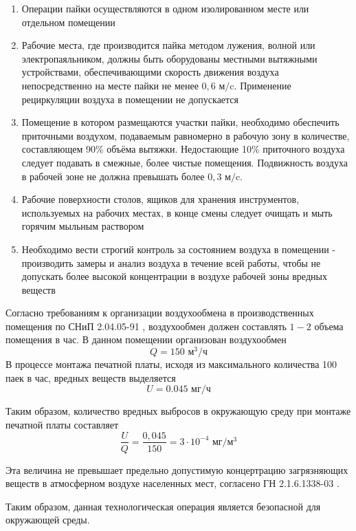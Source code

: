 \begin{enumerate}
    \item Операции пайки осуществляются в одном изолированном месте или отдельном помещении
    \item Рабочие места, где производится пайка методом лужения, волной или
        электропаяльником, должны быть оборудованы местными вытяжными устройствами,
        обеспечивающими скорость движения воздуха непосредственно на месте пайки
        не менее $0,6 \text{ м}/\text{c}$. Применение рециркуляции воздуха в
        помещении не допускается
    \item Помещение в котором размещаются участки пайки, необходимо обеспечить
        приточными воздухом, подаваемым равномерно в рабочую зону в количестве,
        составляющем 90\% объёма вытяжки. Недостающие 10\% приточного воздуха следует
        подавать в смежные, более чистые помещения. Подвижность воздуха в рабочей
        зоне не должна превышать более $0,3 \text{ м}/\text{c}$.
    \item Рабочие поверхности столов, ящиков для хранения инструментов, используемых
        на рабочих местах, в конце смены следует очищать и мыть горячим мыльным раствором
    \item Необходимо вести строгий контроль за состоянием воздуха в помещении -
        производить замеры и анализ воздуха в течение всей работы, чтобы не
        допускать более высокой концентрации в воздухе рабочей зоны вредных веществ
\end{enumerate}

Согласно требованиям к организации воздухообмена в производственных помещения
по СНиП 2.04.05-91 \cite{ecology_snip_04_05_95}, воздухообмен должен составлять
$1 - 2$ объема помещения в час. В данном помещении организован воздухообмен
$$
    Q = 150 \text{ м}^3/\text{ч}
$$
В процессе монтажа печатной платы, исходя из максимального количества 100 паек
в час, вредных веществ выделяется
$$
    U = 0.045 \text{ мг}/\text{ч}
$$

Таким образом, количество вредных выбросов в окружающую среду при монтаже
печатной платы составляет
$$
    \frac{U}{Q} = \frac{0,045}{150} = 3 \cdot 10^{-4} \text{ мг}/\text{м}^3
$$

Эта величина не превышает предельно допустимую концертрацию загрязняющих веществ
в атмосферном воздухе населенных мест, согласено ГН 2.1.6.1338-03 \cite{ecology_hygiene_norm_1338_03}.

Таким образом, данная технологическая операция является безопасной для окружающей среды.
